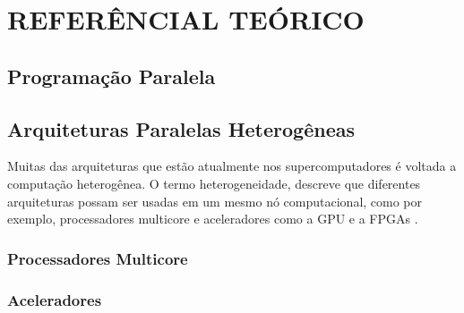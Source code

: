 
\chapter{REFERÊNCIAL TEÓRICO}
\label{chap:ref-teorico}

\section{Programação Paralela}

\section{Arquiteturas Paralelas Heterogêneas}
Muitas das arquiteturas que estão atualmente nos supercomputadores é voltada a computação heterogênea.
O termo heterogeneidade, descreve que diferentes arquiteturas possam ser usadas em um mesmo nó computacional, como por exemplo, processadores multicore e aceleradores como a GPU e a FPGAs \cite{intrArqHete:2012}.



\subsection{Processadores Multicore}
\subsection{Aceleradores}



